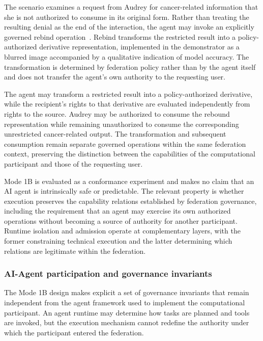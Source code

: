 \documentclass[twoside,11pt]{article}
\begin{document}
The scenario examines a request from Audrey for cancer-related information that she is not authorized to consume in its original form. Rather than treating the resulting denial as the end of the interaction, the agent may invoke an explicitly governed rebind operation~\cite{Fenoglio_RSOS_2026}. Rebind transforms the restricted result into a policy-authorized derivative representation, implemented in the demonstrator as a blurred image accompanied by a qualitative indication of model accuracy. The transformation is determined by federation policy rather than by the agent itself and does not transfer the agent's own authority to the requesting user.

The agent may   transform a restricted result into a policy-authorized derivative, while the recipient's rights to that derivative are evaluated independently from rights to the source. Audrey may be authorized to consume the rebound representation while remaining unauthorized to consume the corresponding unrestricted cancer-related output. The transformation and subsequent consumption remain separate governed operations within the same federation context, preserving the distinction between the capabilities of the computational participant and those of the requesting user.

Mode 1B is  evaluated as a conformance experiment and makes no claim that an AI agent is intrinsically safe or predictable. The relevant property is whether execution preserves the capability relations established by federation governance, including the requirement that an agent may exercise its own authorized operations without becoming a source of authority for another participant. Runtime isolation and admission   operate at complementary layers, with the former constraining technical execution and the latter determining which relations are legitimate within the federation.

\subsubsection{AI-Agent participation and governance invariants}

The Mode 1B design makes explicit a set of governance invariants that remain independent from the agent framework used to implement the computational participant. An agent runtime may determine how tasks are planned and tools are invoked, but the execution mechanism cannot redefine the authority under which the participant entered the federation.
\end{document}
